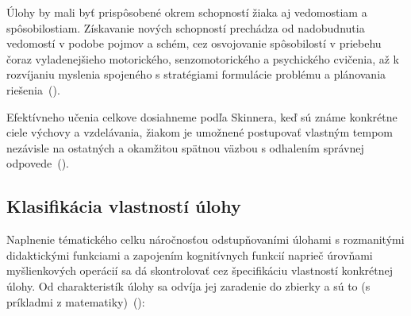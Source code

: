Úlohy by mali byť prispôsobené okrem schopností žiaka aj vedomostiam a spôsobilostiam. Získavanie nových schopností prechádza od nadobudnutia vedomostí v podobe pojmov a schém, cez osvojovanie spôsobilostí v priebehu čoraz vyladenejšieho motorického, senzomotorického a psychického cvičenia, až k rozvíjaniu myslenia spojeného s stratégiami formulácie problému a plánovania riešenia~(\cite{pavlovkin_ziak_1989}).

Efektívneho učenia celkove dosiahneme podľa Skinnera, keď sú známe konkrétne ciele výchovy a vzdelávania, žiakom je umožnené postupovať vlastným tempom nezávisle na ostatných a okamžitou spätnou väzbou s odhalením správnej odpovede~(\cite{pavlovkin_ziak_1989}).

\subsection{Klasifikácia vlastností úlohy}
Naplnenie tématického celku náročnosťou odstupňovaními úlohami s rozmanitými didaktickými funkciami a zapojením kognitívnych funkcií naprieč úrovňami myšlienkových operácií sa dá skontrolovať cez špecifikáciu vlastností konkrétnej úlohy. Od charakteristík úlohy sa odvíja  jej zaradenie do zbierky a sú to (s príkladmi z matematiky)~(\cite{mindakova_tvorba_2008}):

